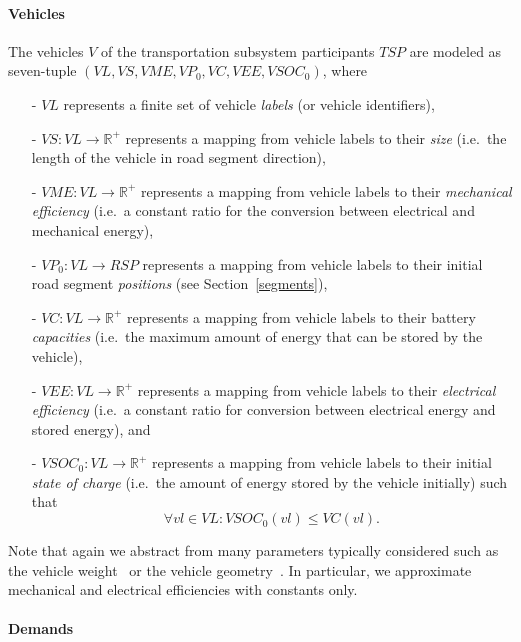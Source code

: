 \paragraph{Vehicles}
\label{vehicles}

The vehicles $V$ of the transportation subsystem participants $TSP$ are modeled as seven-tuple $(VL, VS, VME, VP_0, VC, VEE, VSOC_0)$, where
\begin{itemize}
	\item[-] $VL$ represents a finite set of vehicle \textit{labels} (or vehicle identifiers),
	\item[-] $VS: VL \rightarrow \mathbb{R}^+$ represents a mapping from vehicle labels to their \textit{size} (i.e.\ the length of the vehicle in road segment direction),
	\item[-] $VME: VL \rightarrow \mathbb{R}^+$ represents a mapping from vehicle labels to their \textit{mechanical efficiency} (i.e.\ a constant ratio for the conversion between electrical and mechanical energy),
	\item[-] $VP_0: VL \rightarrow RSP$ represents a mapping from vehicle labels to their initial road segment \textit{positions} (see Section~\ref{segments}),
	\item[-] $VC: VL \rightarrow \mathbb{R}^+$ represents a mapping from vehicle labels to their battery \textit{capacities} (i.e.\ the maximum amount of energy that can be stored by the vehicle),
	\item[-] $VEE: VL \rightarrow \mathbb{R}^+$ represents a mapping from vehicle labels to their \textit{electrical efficiency} (i.e.\ a constant ratio for conversion between electrical energy and stored energy), and
	\item[-] $VSOC_0: VL \rightarrow \mathbb{R}^+$ represents a mapping from vehicle labels to their initial \textit{state of charge} (i.e.\ the amount of energy stored by the vehicle initially) such that
	\[
		\forall vl \in VL : VSOC_0(vl) \leq VC(vl) \textrm{.}
	\]
\end{itemize}
Note that again we abstract from many parameters typically considered such as the vehicle weight~\cite{?} or the vehicle geometry~\cite{?}. In particular, we approximate mechanical and electrical efficiencies with constants only.

\paragraph{Demands}
\label{demands}

